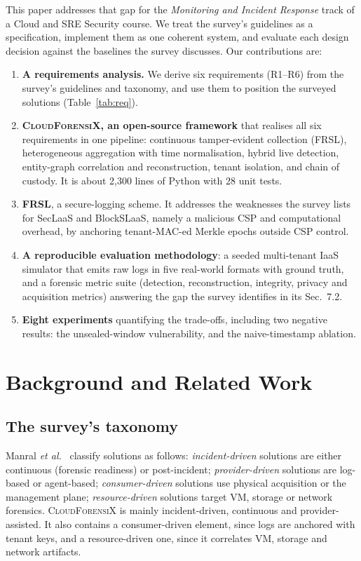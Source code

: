 \documentclass[conference,10pt]{IEEEtran}
\newcommand{\ours}{\textsc{CloudForensiX}}
\begin{document}
This paper addresses that gap for the \emph{Monitoring and Incident Response} track of a Cloud and SRE Security course. We treat the survey's guidelines as a specification, implement them as one coherent system, and evaluate each design decision against the baselines the survey discusses. Our contributions are:
\begin{enumerate}
\item \textbf{A requirements analysis.} We derive six requirements (R1--R6) from the survey's guidelines and taxonomy, and use them to position the surveyed solutions (Table~\ref{tab:req}).
\item \textbf{\ours{}, an open-source framework} that realises all six requirements in one pipeline: continuous tamper-evident collection (FRSL), heterogeneous aggregation with time normalisation, hybrid live detection, entity-graph correlation and reconstruction, tenant isolation, and chain of custody. It is about 2,300 lines of Python with 28 unit tests.
\item \textbf{FRSL}, a secure-logging scheme. It addresses the weaknesses the survey lists for SecLaaS and BlockSLaaS, namely a malicious CSP and computational overhead, by anchoring tenant-MAC-ed Merkle epochs outside CSP control.
\item \textbf{A reproducible evaluation methodology}: a seeded multi-tenant IaaS simulator that emits raw logs in five real-world formats with ground truth, and a forensic metric suite (detection, reconstruction, integrity, privacy and acquisition metrics) answering the gap the survey identifies in its Sec.~7.2.
\item \textbf{Eight experiments} quantifying the trade-offs, including two negative results: the unsealed-window vulnerability, and the naive-timestamp ablation.
\end{enumerate}

\section{Background and Related Work}
\label{sec:related}
\subsection{The survey's taxonomy}
Manral \textit{et al.}~\cite{manral2019} classify solutions as follows:
\emph{incident-driven} solutions are either continuous (forensic readiness) or post-incident;
\emph{provider-driven} solutions are log-based or agent-based;
\emph{consumer-driven} solutions use physical acquisition or the management plane;
\emph{resource-driven} solutions target VM, storage or network forensics.
\ours{} is mainly incident-driven, continuous and provider-assisted. It also contains a consumer-driven element, since logs are anchored with tenant keys, and a resource-driven one, since it correlates VM, storage and network artifacts.
\end{document}

